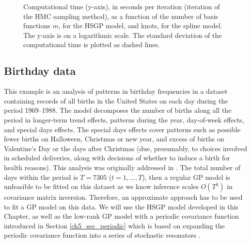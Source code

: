 \documentclass[onecolumn,a4paper,11pt]{article}
\begin{document}
\begin{figure}
\centering
{}
\caption{Computational time (y-axis), in seconds per iteration (iteration of the HMC sampling method), as a function of the number of basis functions $m$, for the HSGP model, and knots, for the spline model. The y-axis is on a logarithmic scale. The standard deviation of the computational time is plotted as dashed lines.}
  \label{ch5_fig11_time_exI}
\end{figure}


\subsection{Birthday data}\label{ch5_sec_birthday}
This example is an analysis of patterns in birthday frequencies in a dataset containing records of all births in the United States on each day during the period 1969–1988. The model decomposes the number of births along all the period in longer-term trend effects, patterns during the year, day-of-week effects, and special days effects. The special days effects cover patterns such as possible fewer births on Halloween, Christmas or new year, and excess of births on Valentine’s Day or the days after Christmas (due, presumably, to choices involved in scheduled deliveries, along with decisions of whether to induce a birth for health reasons). This analysis was originally addressed in \cite{gelman2013bayesian}. The total number of days within the period is $T=7305$ ($t=1,\dots,T$), then a regular GP model is unfeasible to be fitted on this dataset as we know inference scales $O(T^3)$ in covariance matrix inversion. 
Therefore, an approximate approach has to be used to fit a GP model on this data. We will use the HSGP model developed in this Chapter, as well as the low-rank GP model with a periodic covariance function introduced in Section \ref{ch5_sec_periodic} which is based on expanding the periodic covariance function into a series of stochastic resonators \citep{solin2014explicit}.
\end{document}
